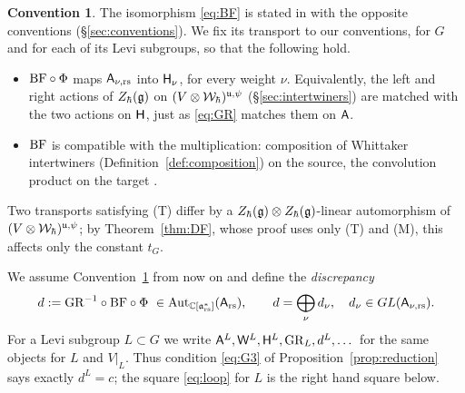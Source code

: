 \documentclass{article}
\theoremstyle{plain}
\theoremstyle{definition}
\newtheorem{convention}[theorem]{Convention}
\theoremstyle{remark}
\numberwithin{equation}{section}
\begin{document}
\begin{convention}\label{conv:BF}
The isomorphism \eqref{eq:BF} is stated in \cite{bezrukavnikov2026equivariantsatakecategorykostantwhittaker} with the opposite conventions (\S\ref{sec:conventions}). We fix its transport to our conventions, for $G$ and for each of its Levi subgroups, so that the following hold.
\begin{itemize}
\item[(T)] $\mathrm{BF}\circ\Phi$ maps $\mathsf A_{\nu,\mathrm{rs}}$ into $\mathsf H_\nu$, for every weight $\nu$. Equivalently, the left and right actions of $Z_\hbar(\mathfrak{g})$ on $(V\otimes\mathcal{W}_\hbar)^{\mathfrak{u},\psi}$ (\S\ref{sec:intertwiners}) are matched with the two actions on $\mathsf H$, just as \eqref{eq:GR} matches them on $\mathsf A$.
\item[(M)] $\mathrm{BF}$ is compatible with the multiplication: composition of Whittaker intertwiners (Definition~\ref{def:composition}) on the source, the convolution product on the target \cite[Theorem 6(b)]{bezrukavnikov2026equivariantsatakecategorykostantwhittaker}.
\end{itemize}
Two transports satisfying (T) differ by a $Z_\hbar(\mathfrak{g})\otimes Z_\hbar(\mathfrak{g})$-linear automorphism of $(V\otimes\mathcal{W}_\hbar)^{\mathfrak{u},\psi}$; by Theorem~\ref{thm:DF}, whose proof uses only (T) and (M), this affects only the constant $t_G$.
\end{convention}

We assume Convention~\ref{conv:BF} from now on and define the \emph{discrepancy}
\[
d:=\GR^{-1}\circ\BF\circ\Phi\ \in\operatorname{Aut}_{\Crs}(\sfA_\rs),\qquad d=\bigoplus_\nu d_\nu,\quad d_\nu\in GL(\sfA_{\nu,\rs}).
\]
For a Levi subgroup $L\subset G$ we write $\mathsf A^L,\mathsf W^L,\mathsf H^L,\mathrm{GR}_L,d^L,\dots$ for the same objects for $L$ and $V|_L$. Thus condition \eqref{eq:G3} of Proposition~\ref{prop:reduction} says exactly $d^L=c$; the square \eqref{eq:loop} for $L$ is the right hand square below.
\end{document}
